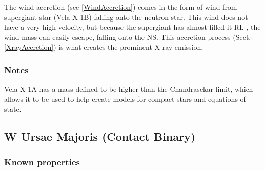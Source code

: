 \documentclass[12pt, letterpaper]{article}
\begin{document}
        The wind accretion (see \ref{WindAccretion}) comes in the form of wind from supergiant star (Vela X-1B) falling onto the neutron star. This wind does not have a very high velocity, but because the supergiant has almost filled it RL \cite{Kretschmar_2021}, the wind mass can easily escape, falling onto the NS. This accretion process (Sect. \ref{XrayAccretion}) is what creates the prominent X-ray emission.

        \subsubsection{Notes}   
            Vela X-1A has a mass defined to be higher than the Chandrasekar limit, which allows it to be used to help create models for compact stars and equations-of-state. \cite{Kretschmar_2021}
        
    \subsection{\centering W Ursae Majoris (Contact Binary)}
        \subsubsection{Known properties}
\end{document}
